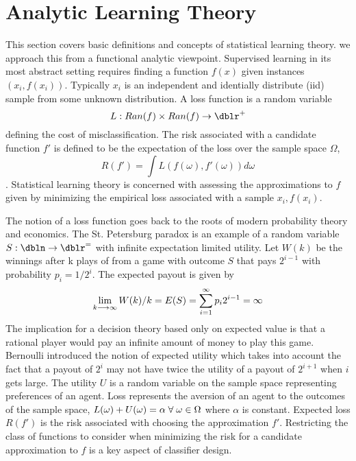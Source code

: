 \section{Analytic Learning Theory}
This section covers basic definitions and concepts of statistical learning theory.  we approach this from a functional analytic viewpoint.
Supervised learning in its most abstract setting requires finding a function $f(x)$ given instances ${ (x_i ,f(x_i))}$. Typically ${x_i}$ is an independent and identially distribute (iid) sample from some unknown distribution.  A loss function is a random variable
\[ L : Ran(f) \times Ran(f) \rightarrow \dblr^+\]
 defining the cost of misclassification.  The risk associated with a candidate function $f'$ is defined to be the expectation of the loss over the sample space $\Omega$,
\begin{equation*} R(f')=\int L( f(\omega), f'(\omega)) d\omega\end{equation*}.
Statistical learning theory is concerned with assessing the approximations to $f$ given by minimizing the empirical loss associated with a sample ${x_i ,f(x_i)}$.

The notion of a loss function goes back to the roots of modern probability theory and economics.  The St. Petersburg paradox is an example of a random variable $S : \dbln \rightarrow \dblr^=$ with infinite expectation limited utility. Let $W(k)$ be the winnings after k plays of from a game with outcome $S$ that pays $2^{i-1}$ with probability $p_i=1/2^i$. The expected payout is given by
\begin{equation*}
\lim_{k\longrightarrow\infty} W(k)/k =E(S)=\sum\limits_{i=1}^{\infty} p_i 2^{i-1}= \infty
\end{equation*} The implication for a decision theory based only on expected value is that a rational player would pay an infinite amount of money to play this game. Bernoulli introduced the notion of expected utility which takes into account the fact that a payout of $2^i$ may not have twice the utility of a payout of $2^{i+1}$ when $i$ gets large.  The utility $U$ is a random variable on the sample space representing preferences of an agent.  Loss represents the aversion of an agent to the outcomes of the sample space, $L(\omega)+U(\omega) = \alpha \; \forall \; \omega \in \Omega$ where $\alpha$ is constant.  Expected loss $R(f')$ is the risk associated with choosing the approximation $f'$. Restricting the class of functions to consider when minimizing the risk for a candidate approximation to $f$ is a key aspect of classifier design.

